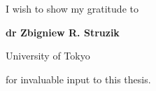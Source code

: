 \thispagestyle{empty}
\mbox{}
\vfill
\hfill I wish to show my gratitude to
\vspace{0.2cm}

\hfill \textbf{dr Zbigniew R. Struzik}

\hfill University of Tokyo
\vspace{0.2cm}

\hfill for invaluable input to this thesis.

\vspace{2cm}

